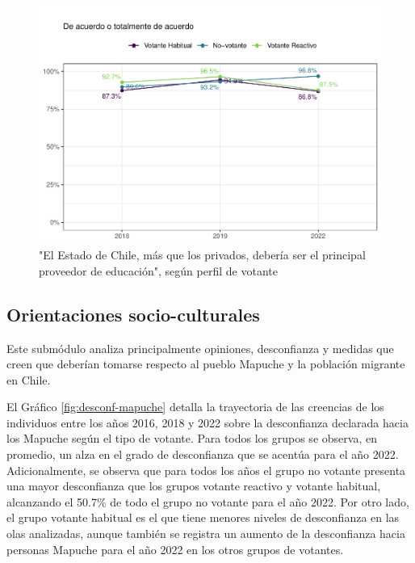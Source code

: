 \documentclass[
  12pt,
]{book}
\begin{document}
\begin{figure}

{\centering \includegraphics{reporte-elsoc_files/figure-latex/graf-educacion-1} 

}

\caption{"El Estado de Chile, más que los privados, debería ser el principal proveedor de educación", según perfil de votante}\label{fig:graf-educacion}
\end{figure}

\hypertarget{orientaciones-socio-culturales}{%
\subsection{Orientaciones socio-culturales}\label{orientaciones-socio-culturales}}

Este submódulo analiza principalmente opiniones, desconfianza y medidas que creen que deberían tomarse respecto al pueblo Mapuche y la población migrante en Chile.

El Gráfico \ref{fig:desconf-mapuche} detalla la trayectoria de las creencias de los individuos entre los años 2016, 2018 y 2022 sobre la desconfianza declarada hacia los Mapuche según el tipo de votante. Para todos los grupos se observa, en promedio, un alza en el grado de desconfianza que se acentúa para el año 2022. Adicionalmente, se observa que para todos los años el grupo no votante presenta una mayor desconfianza que los grupos votante reactivo y votante habitual, alcanzando el 50.7\% de todo el grupo no votante para el año 2022. Por otro lado, el grupo votante habitual es el que tiene menores niveles de desconfianza en las olas analizadas, aunque también se registra un aumento de la desconfianza hacia personas Mapuche para el año 2022 en los otros grupos de votantes.
\end{document}
